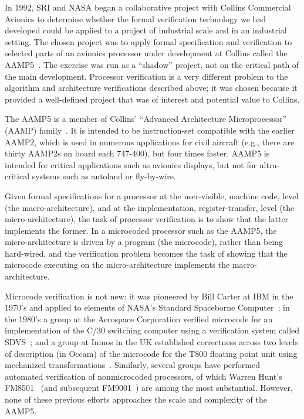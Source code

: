 In 1992, SRI and NASA began a collaborative project with Collins
Commercial Avionics to determine whether the formal verification
technology we had developed could be applied to a project of
industrial scale and in an industrial setting.  The chosen project
was to apply formal specification and verification to selected parts
of an avionics processor under development at Collins called the
AAMP5~\cite{Miller&Srivas95}.  The exercise was run as a ``shadow''
project, not on the critical path of the main development.  Processor
verification is a very different problem to the algorithm and
architecture verifications described above; it was chosen because
it provided a well-defined project that was of interest and potential
value to Collins.

The AAMP5 is a member of Collins' ``Advanced Architecture
Microprocessor'' (AAMP) family~\cite{Best82:CAPS}.  It is intended to
be instruction-set compatible with the earlier AAMP2, which is used
in numerous applications for civil aircraft (e.g., there are thirty AAMP2s
on board each 747-400), but four times faster.  AAMP5 is intended for
critical applications such as avionics displays, but not for
ultra-critical systems such as autoland or fly-by-wire.

Given formal specifications for a processor at the user-visible,
machine code, level (the macro-architecture), and at the
implementation, register-transfer, level (the micro-architecture),
the task of processor verification is to show that the latter
implements the former.  In a microcoded processor such as the AAMP5,
the micro-architecture is driven by a program (the microcode),
rather than being hard-wired, and the verification problem becomes
the task of showing that the microcode executing on the
micro-architecture implements the macro-architecture.

Microcode verification is not new: it was pioneered by Bill Carter at
IBM in the 1970's and applied to elements of NASA's Standard
Spaceborne Computer~\cite{Carter78}; in the 1980's a group at the
Aerospace Corporation verified microcode for an implementation of the
C/30 switching computer using a verification system called
SDVS~\cite{Cook90:C30}; and a group at Inmos in the UK established
correctness across two levels of description (in Occam) of the
microcode for the T800 floating point unit using mechanized
transformations~\cite{May-etal92}.  Similarly, several groups have
performed automated verification of nonmicrocoded processors, of
which Warren Hunt's FM8501~\cite{Hunt94:book} (and subsequent
FM9001~\cite{Hunt&Brock92}) are among the most substantial.  However,
none of these previous efforts approaches the scale and complexity of
the AAMP5.

